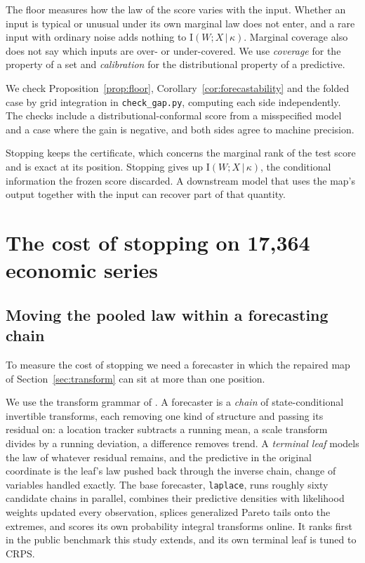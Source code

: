 \documentclass[11pt]{article}
\theoremstyle{remark}
\newcommand{\I}{\mathrm{I}}
\newcommand{\given}{\,|\,}
\begin{document}
The floor measures how the law of the score varies with the input. Whether an input
is typical or unusual under its own marginal law does not enter, and a rare input with
ordinary noise adds nothing to $\I(W;X\given\kappa)$. Marginal coverage also does not
say which inputs are over- or under-covered. We use \emph{coverage} for the property of
a set and \emph{calibration} for the distributional property of a predictive.

We check Proposition~\ref{prop:floor}, Corollary~\ref{cor:forecastability} and the
folded case by grid integration in \texttt{check\_gap.py}, computing each side
independently. The checks include a distributional-conformal score from a misspecified
model and a case where the gain is negative, and both sides agree to machine precision.

Stopping keeps the certificate, which concerns the marginal rank of the test
score and is exact at its position. Stopping gives up $\I(W;X\given\kappa)$, the
conditional information the frozen score discarded. A downstream model that uses
the map's output together with the input can recover part of that quantity.

\section{The cost of stopping on 17{,}364 economic series}\label{sec:price}

\subsection{Moving the pooled law within a forecasting chain}\label{sec:grammar}

To measure the cost of stopping we need a forecaster in which the repaired map of
Section~\ref{sec:transform} can sit at more than one position.

We use the transform grammar of \citet{cotton2026transforms}. A
forecaster is a \emph{chain} of state-conditional invertible transforms, each
removing one kind of structure and passing its residual on: a location tracker
subtracts a running mean, a scale transform divides by a running deviation, a
difference removes trend. A \emph{terminal leaf} models the law of whatever
residual remains, and the predictive in the original coordinate is the leaf's
law pushed back through the inverse chain, change of variables handled exactly.
The base forecaster, \texttt{laplace}, runs roughly sixty candidate chains in
parallel, combines their predictive densities with likelihood weights updated
every observation, splices generalized Pareto tails onto the extremes, and
scores its own probability integral transforms online. It ranks first in the
public benchmark this study extends, and its own terminal leaf is tuned to
CRPS.
\end{document}
